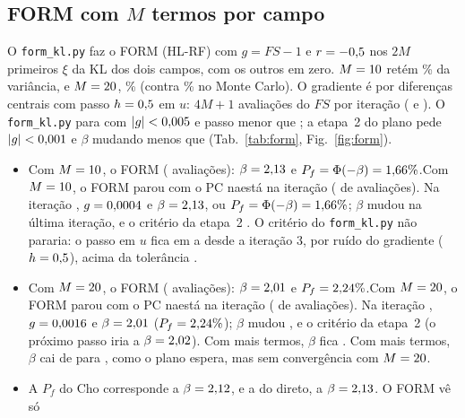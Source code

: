 \documentclass[11pt,a4paper]{article}
\begin{document}
\subsection{FORM com \texorpdfstring{$M$}{M} termos por campo}
O \texttt{form\_kl.py} faz o FORM (HL-RF) com $g = FS - 1$ e $r = -0{,}5$ nos $2M$ primeiros $\xi$ da KL dos dois
campos, com os outros em zero. $M = 10$ retém \FormDezVar\% da variância, e $M = 20$, \FormVinteVar\%
(contra \ChoKLvar\% no Monte Carlo). O gradiente é por diferenças centrais com passo $h = 0{,}5$ em $u$: $4M + 1$
avaliações do $FS$ por iteração (\FormDezAvalIt{} e \FormVinteAvalIt). O \texttt{form\_kl.py} para com $|g| < 0{,}005$
e passo menor que \FormTolP; a etapa~2 do plano pede $|g| < 0{,}001$ e $\beta$ mudando menos que \FormTolBNovo{}
(Tab.~\ref{tab:form}, Fig.~\ref{fig:form}).
\begin{itemize}
\item \ifformdezpronto Com $M = 10$, o FORM \FormDezConvergiu{} (\FormDezAval{} avaliações):
$\beta = 2{,}13$ e $P_f = \Phi(-\beta) = 1{,}66\%$.\else Com $M = 10$, o FORM \ifpcparou parou com o PC
na\else está na\fi{} iteração \FormDezItAtual{} (\FormDezFeitas{} de \FormDezAvalIt{} avaliações). Na iteração
\FormDezUltIt, $g = 0{,}0004$ e $\beta = 2{,}13$, ou $P_f = \Phi(-\beta) = 1{,}66\%$; $\beta$ mudou
\FormDezDBeta{} na última iteração, e o critério da etapa~2 \FormDezCritNovo.\fi{}
\ifformdezpassoacima O critério do \texttt{form\_kl.py} não pararia: o passo em $u$ fica em \FormDezPassoMin{} a
\FormDezPasso{} desde a iteração 3, por ruído do gradiente ($h = 0{,}5$), acima da tolerância \FormTolP.\fi
\item \ifformvintepronto Com $M = 20$, o FORM \FormVinteConvergiu{} (\FormVinteAval{} avaliações):
$\beta = 2{,}01$ e $P_f = 2{,}24\%$.\else Com $M = 20$, o FORM \ifpcparou parou com o PC
na\else está na\fi{} iteração \FormVinteItAtual{} (\FormVinteFeitas{} de \FormVinteAvalIt{} avaliações). Na iteração
\FormVinteUltIt, $g = 0{,}0016$ e $\beta = 2{,}01$ ($P_f = 2{,}24\%$); $\beta$ mudou \FormVinteDBeta, e o
critério da etapa~2 \FormVinteCritNovo{} (o próximo passo iria a $\beta = 2{,}02$).\fi{}
\ifformdezpronto\ifformvintepronto Com mais termos, $\beta$ fica \FormCompara.\fi\fi
\ifpcparou\ifformvintepronto\else Com mais termos, $\beta$ cai de \FormDezBeta{} para \FormVinteBeta, como o plano
espera, mas sem convergência com $M = 20$.\fi\fi
\item A $P_f$ do Cho corresponde a $\beta = 2{,}12$, e a do direto, a $\beta = 2{,}13$. O FORM vê só

\end{itemize}
\end{document}
